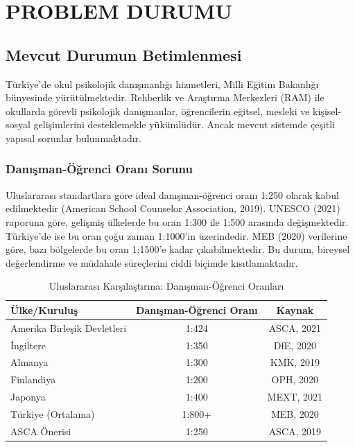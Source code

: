 
\chapter{PROBLEM DURUMU}

\section{Mevcut Durumun Betimlenmesi}

Türkiye'de okul psikolojik danışmanlığı hizmetleri, Milli Eğitim Bakanlığı bünyesinde yürütülmektedir. Rehberlik ve Araştırma Merkezleri (RAM) ile okullarda görevli psikolojik danışmanlar, öğrencilerin eğitsel, mesleki ve kişisel-sosyal gelişimlerini desteklemekle yükümlüdür. Ancak mevcut sistemde çeşitli yapısal sorunlar bulunmaktadır.

\subsection{Danışman-Öğrenci Oranı Sorunu}

Uluslararası standartlara göre ideal danışman-öğrenci oranı 1:250 olarak kabul edilmektedir (American School Counselor Association, 2019). UNESCO (2021) raporuna göre, gelişmiş ülkelerde bu oran 1:300 ile 1:500 arasında değişmektedir. Türkiye'de ise bu oran çoğu zaman 1:1000'in üzerindedir. MEB (2020) verilerine göre, bazı bölgelerde bu oran 1:1500'e kadar çıkabilmektedir. Bu durum, bireysel değerlendirme ve müdahale süreçlerini ciddi biçimde kısıtlamaktadır.

\begin{table}[H]
\centering
\caption{Uluslararası Karşılaştırma: Danışman-Öğrenci Oranları}
\label{tab:danismanoran}
\begin{tabular}{lcc}
\toprule
\textbf{Ülke/Kuruluş} & \textbf{Danışman-Öğrenci Oranı} & \textbf{Kaynak} \\
\midrule
Amerika Birleşik Devletleri & 1:424 & ASCA, 2021 \\
İngiltere & 1:350 & DfE, 2020 \\
Almanya & 1:300 & KMK, 2019 \\
Finlandiya & 1:200 & OPH, 2020 \\
Japonya & 1:400 & MEXT, 2021 \\
Türkiye (Ortalama) & 1:800+ & MEB, 2020 \\
ASCA Önerisi & 1:250 & ASCA, 2019 \\
\bottomrule
\end{tabular}
\end{table}

